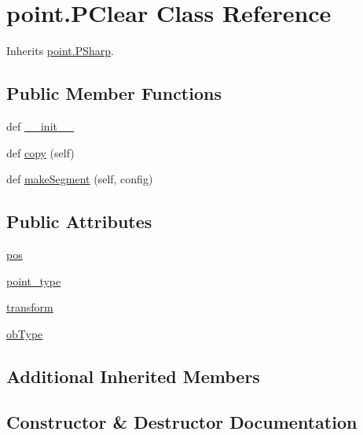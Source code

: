 \hypertarget{classpoint_1_1_p_clear}{}\section{point.\+P\+Clear Class Reference}
\label{classpoint_1_1_p_clear}


Inherits \hyperlink{classpoint_1_1_p_sharp}{point.\+P\+Sharp}.

\subsection*{Public Member Functions}
\begin{DoxyCompactItemize}
\item 
def \hyperlink{classpoint_1_1_p_clear_acbccd5e8a9bf836fdfdefe1b69e36acc}{\+\_\+\+\_\+init\+\_\+\+\_\+}
\item 
def \hyperlink{classpoint_1_1_p_clear_ae4949d8b603ad7e93170e3c278dd20e5}{copy} (self)
\item 
def \hyperlink{classpoint_1_1_p_clear_a5283af1ced19d7cd6a03535e18bfbc0b}{make\+Segment} (self, config)
\end{DoxyCompactItemize}
\subsection*{Public Attributes}
\begin{DoxyCompactItemize}
\item 
\hyperlink{classpoint_1_1_p_clear_a6051eea4188c6f2acb1496e95bdc7f06}{pos}
\item 
\hyperlink{classpoint_1_1_p_clear_a2a692cd131203f0018a81476bba88e23}{point\+\_\+type}
\item 
\hyperlink{classpoint_1_1_p_clear_ae84c174d23d054f5109d278998895803}{transform}
\item 
\hyperlink{classpoint_1_1_p_clear_af6452e3be04889160c538093e5eb53ff}{ob\+Type}
\end{DoxyCompactItemize}
\subsection*{Additional Inherited Members}


\subsection{Constructor \& Destructor Documentation}
\hypertarget{classpoint_1_1_p_clear_acbccd5e8a9bf836fdfdefe1b69e36acc}{}
